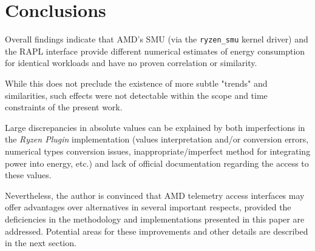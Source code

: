 \section{Conclusions}
\label{sec:conclusions}

Overall findings indicate that AMD’s \gls{SMU} (via the \texttt{ryzen\_smu} kernel
driver) and the \gls{RAPL} interface provide different numerical estimates of
energy consumption for identical workloads and have no proven correlation or
similarity.

While this does not preclude the existence of more subtle "trends" and
similarities, such effects were not detectable within the scope and time
constraints of the present work.

Large discrepancies in absolute values can be explained by both imperfections
in the \emph{Ryzen Plugin} implementation (values interpretation and/or conversion
errors, numerical types conversion issues, inappropriate/imperfect method for
integrating power into energy, etc.) and lack of official documentation regarding
the access to these values.

Nevertheless, the author is convinced that AMD telemetry access interfaces may
offer advantages over alternatives in several important respects, provided the
deficiencies in the methodology and implementations presented in this paper are
addressed. Potential areas for these improvements and other details are described
in the next section.
